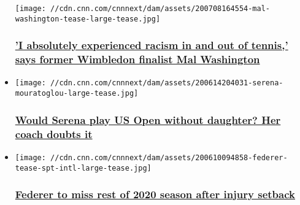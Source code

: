 \begin{itemize}
  \texttt{[image: //cdn.cnn.com/cnnnext/dam/assets/200708164554-mal-washington-tease-large-tease.jpg]}

  \hypertarget{i-absolutely-experienced-racism-in-and-out-of-tennis-says-former-wimbledon-finalist-mal-washington}{%
  \subsubsection{\texorpdfstring{\href{/2020/07/09/tennis/mal-washington-wimbledon-final-cmd-spt-intl/index.html}{'I
  absolutely experienced racism in and out of tennis,' says former
  Wimbledon finalist Mal
  Washington}}{'I absolutely experienced racism in and out of tennis,' says former Wimbledon finalist Mal Washington}}\label{i-absolutely-experienced-racism-in-and-out-of-tennis-says-former-wimbledon-finalist-mal-washington}}
\item
  \href{/2020/06/15/tennis/serena-williams-mouratoglou-tennis-uts-sport-intl/index.html}{}

  \texttt{[image: //cdn.cnn.com/cnnnext/dam/assets/200614204031-serena-mouratoglou-large-tease.jpg]}

  \hypertarget{would-serena-play-us-open-without-daughter-her-coach-doubts-it}{%
  \subsubsection{\texorpdfstring{\href{/2020/06/15/tennis/serena-williams-mouratoglou-tennis-uts-sport-intl/index.html}{Would
  Serena play US Open without daughter? Her coach doubts
  it}}{Would Serena play US Open without daughter? Her coach doubts it}}\label{would-serena-play-us-open-without-daughter-her-coach-doubts-it}}
\item
  \href{/2020/06/10/tennis/roger-federer-injury-tennis-spt-intl/index.html}{}

  \texttt{[image: //cdn.cnn.com/cnnnext/dam/assets/200610094858-federer-tease-spt-intl-large-tease.jpg]}

  \hypertarget{federer-to-miss-rest-of-2020-season-after-injury-setback-}{%
  \subsubsection{\texorpdfstring{\href{/2020/06/10/tennis/roger-federer-injury-tennis-spt-intl/index.html}{Federer
  to miss rest of 2020 season after injury setback
  }}{Federer to miss rest of 2020 season after injury setback }}\label{federer-to-miss-rest-of-2020-season-after-injury-setback-}}
\end{itemize}

